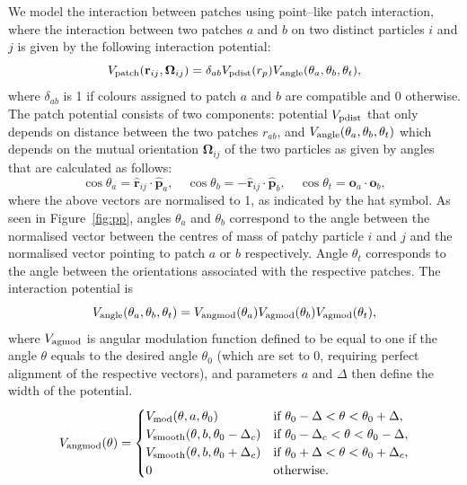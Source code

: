 We model the interaction between patches using point--like patch interaction, where the interaction between two patches $a$ and $b$ on two distinct particles $i$ and $j$ is given by the following interaction potential:
\begin{equation}
V_{\rm patch}(\mathbf{r}_{ij},\mathbf{\Omega}_{ij}) = \delta_{ab} V_{\rm pdist}(r_p) V_{\rm angle}(\theta_a, \theta_b, \theta_t), 
\end{equation}
 where $\delta_{ab}$ is 1 if colours assigned to patch $a$ and $b$ are compatible and 0 otherwise. The patch potential consists of two components: potential $V_{\rm pdist}$ that only depends on distance between the two patches $r_{ab}$, and $V_{\rm angle}(\theta_a, \theta_b, \theta_t)$ which depends on the mutual orientation $\mathbf{\Omega}_{ij}$ of the two particles as given by angles that are calculated as follows:
\begin{equation}
\cos \theta_a =  \mathbf{\hat{r}}_{ij} \cdot \mathbf{\hat{p}}_a, \quad \cos \theta_b =  \mathbf{-\hat{r}}_{ij} \cdot \mathbf{\hat{p}}_b, \quad 
\cos \theta_t =  \mathbf{o}_{a} \cdot \mathbf{o}_b,
\end{equation}
where the above vectors are normalised to 1, as indicated by the hat symbol. As seen in Figure~\ref{fig:pp}, angles $\theta_a$ and $\theta_b$ correspond to the angle between the normalised vector between the centres of mass of patchy particle $i$ and $j$ and the normalised vector pointing to patch $a$ or $b$ respectively. Angle $\theta_t$ corresponds to the angle between the orientations associated with the respective patches. The interaction potential is 
\begin{equation}
    V_{\rm angle}(\theta_a, \theta_b, \theta_t) = V_{\rm angmod}(\theta_a) V_{\rm agmod}(\theta_b)
    V_{\rm agmod}(\theta_t) ,
\end{equation}
where $V_{\rm agmod}$ is angular modulation function defined to be equal to one if the angle $\theta$ equals to the desired angle $\theta_0$ (which are set to $0$, requiring perfect alignment of the respective vectors), and parameters $a$ and  $\Delta$ then define the width of the potential.
\begin{equation}
V_{\rm angmod}(\theta) = \begin{cases}
	V_{\rm mod}(\theta, a, \theta_0)  & \text{if $ \theta_0 - \Delta < \theta < \theta_0 + \Delta  $},\\
	V_{\rm smooth} (\theta, b, \theta_0 - \Delta_c) & \text{if $\theta_0 - \Delta_c < \theta < \theta_0-\Delta $},\\
	V_{\rm smooth} (\theta, b, \theta_0 + \Delta_c) & \text{if $\theta_0 + \Delta < \theta < \theta_0+\Delta_c$},\\
	0 & \text{otherwise}.
	\end{cases} 
\end{equation}
